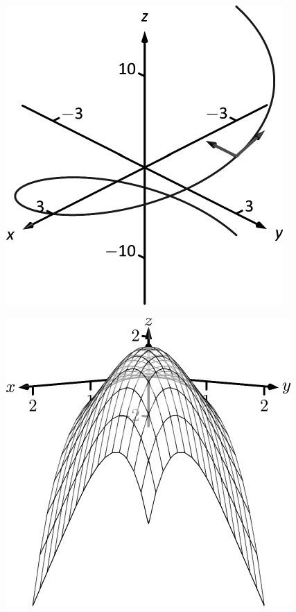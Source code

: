 \documentclass[10pt]{article}
\begin{document}
\includegraphics{figtannorm3_3DBW.pdf}
\texttt{}

\includegraphics{figtp12_3DBW.pdf}
\texttt{}
\end{document}
